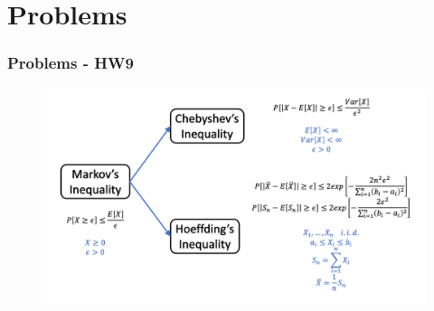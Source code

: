 \documentclass[serif,mathserif,professionalfont]{beamer}
\begin{document}
%	
%	
%	






\section{Problems}



\begin{frame}
	
	\frametitle{Problems - HW9}
	
	\begin{figure}
		\includegraphics[width=1\linewidth]{W12F3}
	\end{figure}
	
	
	
\end{frame}
\end{document}

